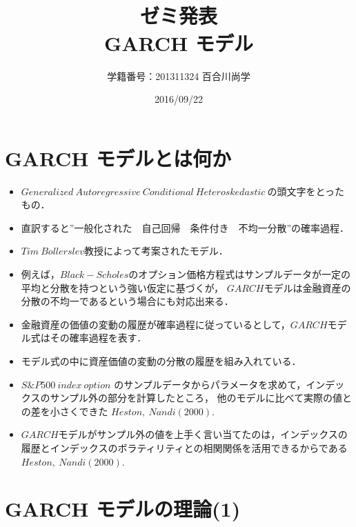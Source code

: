 \documentclass[slide,10pt]{jsarticle}
\def\sheet #1{\section*{\centering \large \bfseries #1}}
\begin{document}
\title{\fontsize{45pt}{2cm}\selectfont \\ゼミ発表\\GARCH モデル\\}
\author{\Huge 学籍番号：201311324 百合川尚学}
\date{\Huge 2016/09/22}
\maketitle

\sheet{\Huge GARCH モデルとは何か}

{\huge
\begin{itemize}
	\vspace{5mm}
	\item $Generalized\ Autoregressive\ Conditional\ Heteroskedastic\ $の頭文字をとったもの．
	\vspace{5mm}
	\item 直訳すると''一般化された　自己回帰　条件付き　不均一分散''の確率過程．
	\vspace{5mm}
	\item $Tim\ Bollerslev$教授によって考案されたモデル．
	\vspace{5mm}
	\item 例えば，$Black-Scholes$のオプション価格方程式はサンプルデータが一定の平均と分散を持つという強い仮定に基づくが，
		$GARCH$モデルは金融資産の分散の不均一であるという場合にも対応出来る．
	\vspace{5mm}
	\item 金融資産の価値の変動の履歴が確率過程に従っているとして，$GARCH$モデル式はその確率過程を表す．
	\vspace{5mm}
	\item モデル式の中に資産価値の変動の分散の履歴を組み入れている．
	\vspace{5mm}
	\item $S\&P500\ index\ option$ のサンプルデータからパラメータを求めて，インデックスのサンプル外の部分を計算したところ，
		他のモデルに比べて実際の値との差を小さくできた $Heston,\ Nandi (2000)$.
	\vspace{5mm}
	\item $GARCH$モデルがサンプル外の値を上手く言い当てたのは，インデックスの履歴とインデックスのボラティリティとの相関関係を活用できるからである $Heston,\ Nandi (2000)$.
\end{itemize}
}

\sheet{\Huge GARCH モデルの理論(1)}
\end{document}
